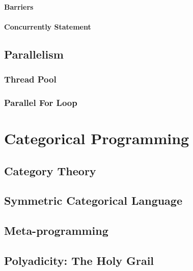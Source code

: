 \documentclass[oneside]{book}
\begin{document}
\subsection{Barriers}
\subsection{Concurrently Statement}

\chapter{Parallelism}
\section{Thread Pool}
\section{Parallel For Loop}

\part{Categorical Programming}
\chapter{Category Theory}
\chapter{Symmetric Categorical Language}
\chapter{Meta-programming}
\chapter{Polyadicity: The Holy Grail}

\appendix
\backmatter
\end{document}
